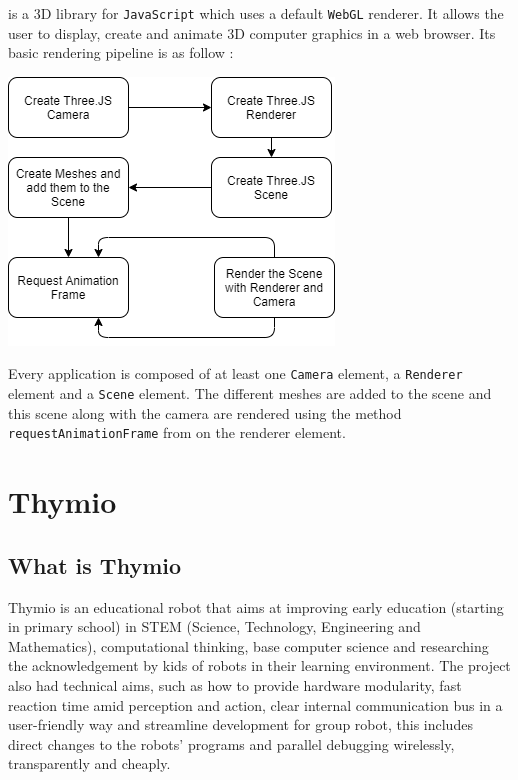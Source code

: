 \documentclass{scrbook}
\begin{document}
 is a 3D library for \texttt{JavaScript} which uses a default \texttt{WebGL} renderer. It allows the user to display, create and animate 3D computer graphics in a web browser. Its basic rendering pipeline is as follow :
\begin{center}
  \includegraphics[scale=0.5]{./basic_threejs_rendering}
\end{center}

Every  application is composed of at least one \texttt{Camera} element, a \texttt{Renderer} element and a \texttt{Scene} element. The different meshes are added to the scene and this scene along with the camera are rendered using the method 
\texttt{requestAnimationFrame} from  on the renderer element. 

\chapter{Thymio}
\section{What is Thymio} 

Thymio is an educational robot that aims at improving early education (starting in primary school) in STEM (Science, Technology, Engineering and Mathematics),
computational thinking, base computer science and researching the acknowledgement by kids of robots in their learning environment.
The project also had technical aims, such as how to provide hardware modularity, fast reaction time amid perception and action,
clear internal communication bus in a user-friendly way and streamline development for group robot, this includes direct changes to the robots’ programs and parallel debugging wirelessly, 
transparently and cheaply.\\
\end{document}
